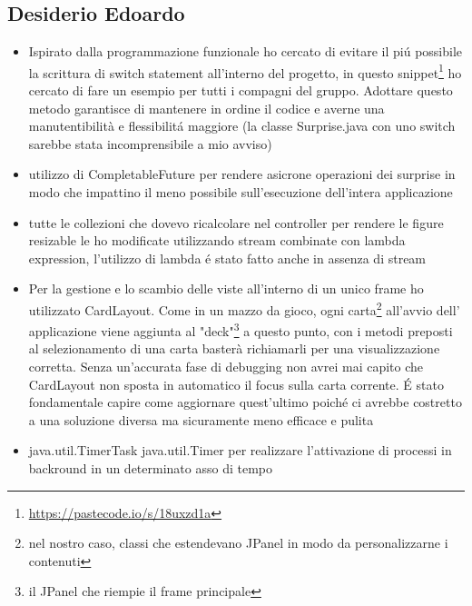 \documentclass[a4paper,12pt]{report}
\begin{document}
\subsection{Desiderio Edoardo}
\begin{itemize}
    \item Ispirato dalla programmazione funzionale ho cercato di evitare il piú possibile la scrittura di switch
          statement all'interno del progetto, in questo snippet\footnote{\url{https://pastecode.io/s/18uxzd1a}} ho cercato
          di fare un esempio per tutti i compagni del gruppo. Adottare questo metodo garantisce di mantenere in ordine il codice
          e averne una manutentibilità e flessibilitá maggiore (la classe Surprise.java con uno switch sarebbe stata incomprensibile a mio avviso)
    \item utilizzo di CompletableFuture per rendere asicrone operazioni dei surprise in modo che impattino il meno possibile
          sull'esecuzione dell'intera applicazione
    \item tutte le collezioni che dovevo ricalcolare nel controller per rendere le figure resizable le ho modificate
          utilizzando stream combinate con lambda expression, l'utilizzo di lambda é stato fatto  anche in assenza di stream
    \item Per la gestione e lo scambio delle viste all'interno di un unico frame ho utilizzato CardLayout.
          Come in un mazzo da gioco,
          ogni carta\footnote{nel nostro caso, classi che estendevano JPanel in modo da personalizzarne i contenuti}
          all'avvio dell' applicazione viene aggiunta al "deck"\footnote{il JPanel che riempie il frame principale}
          a questo punto, con i metodi preposti al selezionamento di una carta basterà richiamarli per una visualizzazione
          corretta.
          Senza un'accurata fase di debugging non avrei mai capito che CardLayout non sposta in automatico il focus
          sulla carta corrente. É stato fondamentale capire come aggiornare quest'ultimo poiché ci avrebbe costretto a una
          soluzione diversa ma sicuramente meno efficace e pulita
    \item java.util.TimerTask java.util.Timer per realizzare l'attivazione di processi in backround in un determinato asso di tempo
\end{itemize}
\end{document}
